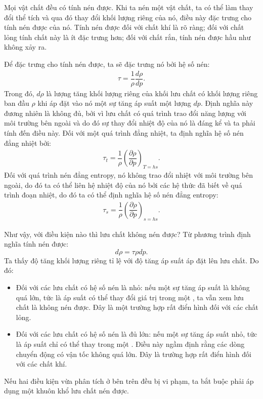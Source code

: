 \documentclass[../../../main.tex]{subfiles}
\begin{document}
	Mọi vật chất đều có tính nén được. Khi ta nén một vật chất, ta có thể làm thay đổi thể tích và qua đó thay đổi khối lượng riêng của nó, điều này đặc trưng cho tính nén được của nó. Tính nén được đối với chất khí là rõ ràng; đối với chất lỏng tính chất này là ít đặc trưng hơn; đối với chất rắn, tính nén được hầu như không xảy ra.
	
	Để đặc trưng cho tính nén được, ta sẽ đặc trưng nó bởi hệ số nén:
		\begin{align}
			\tau=\dfrac{1}{\rho}\dfrac{d\rho}{dp}.
		\end{align}
	Trong đó, $d\rho$ là lượng tăng khối lượng riêng của khối lưu chất có khối lượng riêng ban đầu $\rho$ khi áp đặt vào nó một sự tăng áp suất một lượng $dp$. Định nghĩa này đương nhiên là không đủ, bởi vì lưu chất có quá trình trao đổi năng lượng với môi trường bên ngoài và do đó sự thay đổi nhiệt độ của nó là đáng kể và ta phải tính đến điều này. Đối với một quá trình đẳng nhiệt, ta định nghĩa hệ số nén đẳng nhiệt bởi:
		\begin{align}
			\tau_t=\dfrac{1}{\rho}\left(\dfrac{\partial\rho}{\partial p}\right)_{T=hs}.
		\end{align}
	Đối với quá trình nén đẳng entropy, nó không trao đổi nhiệt với môi trường bên ngoài, do đó ta có thể liên hệ nhiệt độ của nó bởi các hệ thức đã biết về quá trình đoạn nhiệt, do đó ta có thể định nghĩa hệ số nén đẳng entropy:
		\begin{align}
			\tau_s=\dfrac{1}{\rho}\left(\dfrac{\partial\rho}{\partial p}\right)_{s=hs}.
		\end{align}
	
	Như vậy, với điều kiện nào thì lưu chất không nén được? Từ phương trình định nghĩa tính nén được:
		\[
			d\rho=\tau\rho dp.
		\]
	 Ta thấy độ tăng khối lượng riêng tỉ lệ với độ tăng áp suất áp đặt lên lưu chất. Do đó:
	 \begin{itemize}
	 	\item Đối với các lưu chất có hệ số nén là nhỏ: nếu một sự tăng áp suất là không quá lớn, tức là áp suất có thể thay đổi giá trị trong một , ta vẫn xem lưu chất là không nén được. Đây là một trường hợp rất điển hình đối với các chất lỏng.
	 	\item Đối với các lưu chất có hệ số nén là đủ lớn: nếu một sự tăng áp suất nhỏ, tức là áp suất chỉ có thể thay trong một . Điều này ngầm định rằng các dòng chuyển động có vận tốc không quá lớn. Đây là trường hợp rất điển hình đối với các chất khí.
	 \end{itemize}
	 
	 Nếu hai điều kiện vừa phân tích ở bên trên đều bị vi phạm, ta bắt buộc phải áp dụng một khuôn khổ lưu chất nén được.
\end{document}
